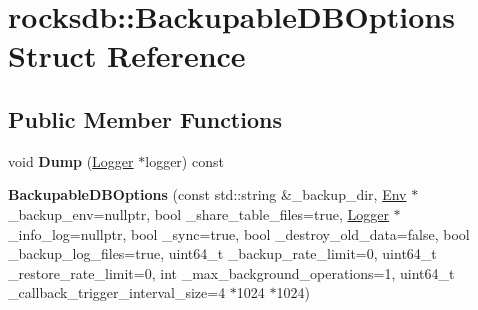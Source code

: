 \hypertarget{structrocksdb_1_1BackupableDBOptions}{}\section{rocksdb\+:\+:Backupable\+D\+B\+Options Struct Reference}
\label{structrocksdb_1_1BackupableDBOptions}
\subsection*{Public Member Functions}
\begin{DoxyCompactItemize}
\item 
void {\bfseries Dump} (\hyperlink{classrocksdb_1_1Logger}{Logger} $\ast$logger) const\hypertarget{structrocksdb_1_1BackupableDBOptions_a22fe4956a960b3253d2f31d94d1109a0}{}\label{structrocksdb_1_1BackupableDBOptions_a22fe4956a960b3253d2f31d94d1109a0}

\item 
{\bfseries Backupable\+D\+B\+Options} (const std\+::string \&\+\_\+backup\+\_\+dir, \hyperlink{classrocksdb_1_1Env}{Env} $\ast$\+\_\+backup\+\_\+env=nullptr, bool \+\_\+share\+\_\+table\+\_\+files=true, \hyperlink{classrocksdb_1_1Logger}{Logger} $\ast$\+\_\+info\+\_\+log=nullptr, bool \+\_\+sync=true, bool \+\_\+destroy\+\_\+old\+\_\+data=false, bool \+\_\+backup\+\_\+log\+\_\+files=true, uint64\+\_\+t \+\_\+backup\+\_\+rate\+\_\+limit=0, uint64\+\_\+t \+\_\+restore\+\_\+rate\+\_\+limit=0, int \+\_\+max\+\_\+background\+\_\+operations=1, uint64\+\_\+t \+\_\+callback\+\_\+trigger\+\_\+interval\+\_\+size=4 $\ast$1024 $\ast$1024)\hypertarget{structrocksdb_1_1BackupableDBOptions_afa67e5c4be408333892a7ee328e48cd6}{}\label{structrocksdb_1_1BackupableDBOptions_afa67e5c4be408333892a7ee328e48cd6}

\end{DoxyCompactItemize}
